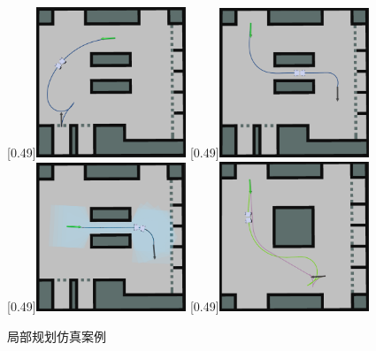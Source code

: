 \documentclass[master,academic]{ysuthesis} %
\begin{document}
	\begin{figure}[!ht]
		\centering
		[0.49\textwidth]{\includegraphics[width=0.4\textwidth]{s1.png}}
		[0.49\textwidth]{\includegraphics[width=0.4\textwidth]{s2.png}}
		[0.49\textwidth]{\includegraphics[width=0.4\textwidth]{s3.png}}
		[0.49\textwidth]{\includegraphics[width=0.4\textwidth]{s4.png}}
		\caption{局部规划仿真案例}
		\label{fig:局部规划仿真案例}
	\end{figure}
\end{document}
